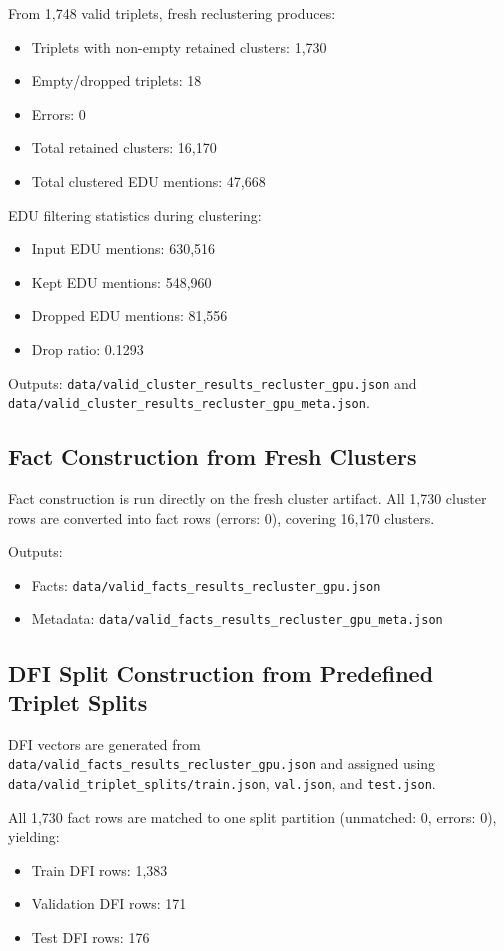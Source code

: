 \documentclass[12pt,a4paper]{article}
\begin{document}
From 1,748 valid triplets, fresh reclustering produces:
\begin{itemize}
\item Triplets with non-empty retained clusters: 1,730
\item Empty/dropped triplets: 18
\item Errors: 0
\item Total retained clusters: 16,170
\item Total clustered EDU mentions: 47,668
\end{itemize}

EDU filtering statistics during clustering:
\begin{itemize}
\item Input EDU mentions: 630,516
\item Kept EDU mentions: 548,960
\item Dropped EDU mentions: 81,556
\item Drop ratio: 0.1293
\end{itemize}

Outputs:
\texttt{data/valid\_cluster\_results\_recluster\_gpu.json} and
\texttt{data/valid\_cluster\_results\_recluster\_gpu\_meta.json}.

\subsection{Fact Construction from Fresh Clusters}

Fact construction is run directly on the fresh cluster artifact.
All 1,730 cluster rows are converted into fact rows (errors: 0),
covering 16,170 clusters.

Outputs:
\begin{itemize}
\item Facts: \texttt{data/valid\_facts\_results\_recluster\_gpu.json}
\item Metadata: \texttt{data/valid\_facts\_results\_recluster\_gpu\_meta.json}
\end{itemize}

\subsection{DFI Split Construction from Predefined Triplet Splits}

DFI vectors are generated from
\texttt{data/valid\_facts\_results\_recluster\_gpu.json}
and assigned using
\texttt{data/valid\_triplet\_splits/train.json},
\texttt{val.json}, and \texttt{test.json}.

All 1,730 fact rows are matched to one split partition (unmatched: 0, errors: 0), yielding:
\begin{itemize}
\item Train DFI rows: 1,383
\item Validation DFI rows: 171
\item Test DFI rows: 176
\end{itemize}
\end{document}
